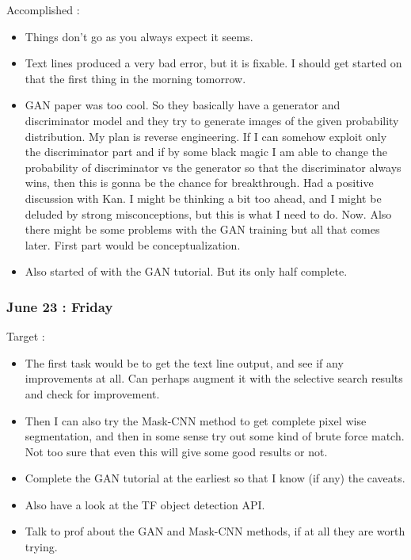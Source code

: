 \documentclass{article}
\begin{document}
Accomplished :
\begin{itemize}
\item Things don't go as you always expect it seems.
\item Text lines produced a very bad error, but it is fixable. I should get started on that the first thing in the morning tomorrow.
\item GAN paper was too cool. So they basically have a generator and discriminator model and they try to generate images of the given probability distribution. My plan is reverse engineering. If I can somehow exploit only the discriminator part and if by some black magic I am able to change the probability of discriminator vs the generator so that the discriminator always wins, then this is gonna be the chance for breakthrough. Had a positive discussion with Kan. I might be thinking a bit too ahead, and I might be deluded by strong misconceptions, but this is what I need to do. Now. Also there might be some problems with the GAN training but all that comes later. First part would be conceptualization.
\item Also started of with the GAN tutorial. But its only half complete.
\end{itemize}

\subsubsection{June 23 : Friday}
Target :
\begin{itemize}
\item The first task would be to get the text line output, and see if any improvements at all. Can perhaps augment it with the selective search results and check for improvement.
\item Then I can also try the Mask-CNN method to get complete pixel wise segmentation, and then in some sense try out some kind of brute force match. Not too sure that even this will give some good results or not.
\item Complete the GAN tutorial at the earliest so that I know (if any) the caveats.
\item Also have a look at the TF object detection API.
\item Talk to prof about the GAN and Mask-CNN methods, if at all they are worth trying.
\end{itemize}
\end{document}
